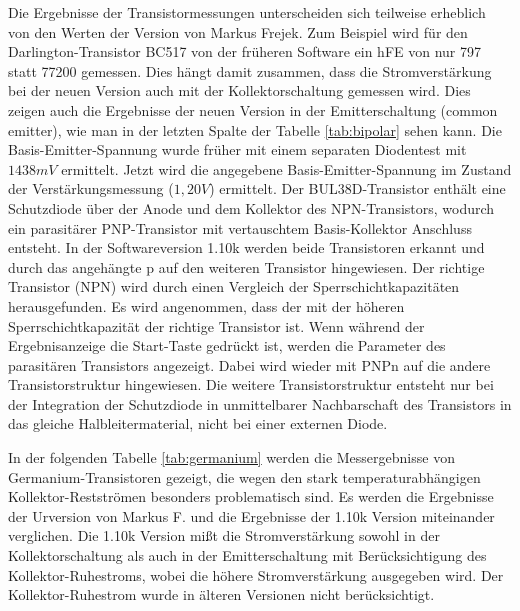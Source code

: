 Die Ergebnisse der Transistormessungen unterscheiden sich teilweise erheblich von den Werten der Version 
von Markus Frejek. Zum Beispiel wird für den Darlington-Transistor BC517 von
der früheren Software ein hFE von nur 797 statt 77200 gemessen. 
Dies hängt damit zusammen, dass die Stromverstärkung bei der neuen Version auch mit der
Kollektorschaltung gemessen wird.
Dies zeigen auch die Ergebnisse der neuen Version in der Emitterschaltung (common emitter),
wie man in der letzten Spalte der Tabelle \ref{tab:bipolar} sehen kann.
Die Basis-Emitter-Spannung wurde früher mit einem separaten Diodentest mit \(1438mV\) ermittelt.
Jetzt wird die angegebene Basis-Emitter-Spannung im Zustand der Verstärkungsmessung (\(1,20V\)) ermittelt.
Der BUL38D-Transistor enthält eine Schutzdiode über der Anode und dem Kollektor des NPN-Transistors,
wodurch ein parasitärer PNP-Transistor mit vertauschtem Basis-Kollektor Anschluss entsteht.
In der Softwareversion 1.10k werden beide Transistoren erkannt und durch das angehängte p auf
den weiteren Transistor hingewiesen.
Der richtige Transistor (NPN) wird durch einen Vergleich der Sperrschichtkapazitäten herausgefunden.
Es wird angenommen, dass der mit der höheren Sperrschichtkapazität der richtige Transistor ist.
Wenn während der Ergebnisanzeige die Start-Taste gedrückt ist, werden die Parameter des parasitären Transistors
angezeigt. Dabei wird wieder mit PNPn auf die andere Transistorstruktur hingewiesen.
Die weitere Transistorstruktur entsteht nur bei der Integration der Schutzdiode in unmittelbarer
Nachbarschaft des Transistors in das gleiche Halbleitermaterial, nicht bei einer externen Diode.

In der folgenden Tabelle \ref{tab:germanium} werden die Messergebnisse von Germanium-Transistoren gezeigt, die wegen den
stark temperaturabhängigen Kollektor-Restströmen besonders problematisch sind.
Es werden die Ergebnisse der Urversion von Markus F. und die Ergebnisse der 1.10k Version
miteinander verglichen. Die 1.10k Version mißt die Stromverstärkung sowohl in der
Kollektorschaltung als auch in der Emitterschaltung mit Berücksichtigung des Kollektor-Ruhestroms,
 wobei die höhere Stromverstärkung ausgegeben wird.
Der Kollektor-Ruhestrom wurde in älteren Versionen nicht berücksichtigt.

